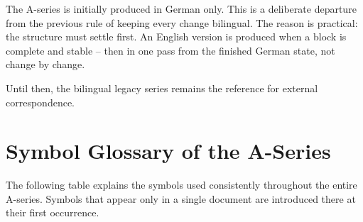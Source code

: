 The A-series is initially produced in German only. This is a deliberate
departure from the previous rule of keeping every change bilingual. The
reason is practical: the structure must settle first. An English version
is produced when a block is complete and stable -- then in one pass from the
finished German state, not change by change.

Until then, the bilingual legacy series remains the reference for external
correspondence.

\section{Symbol Glossary of the A-Series}

The following table explains the symbols used consistently throughout the
entire A-series. Symbols that appear only in a single document are introduced
there at their first occurrence.

